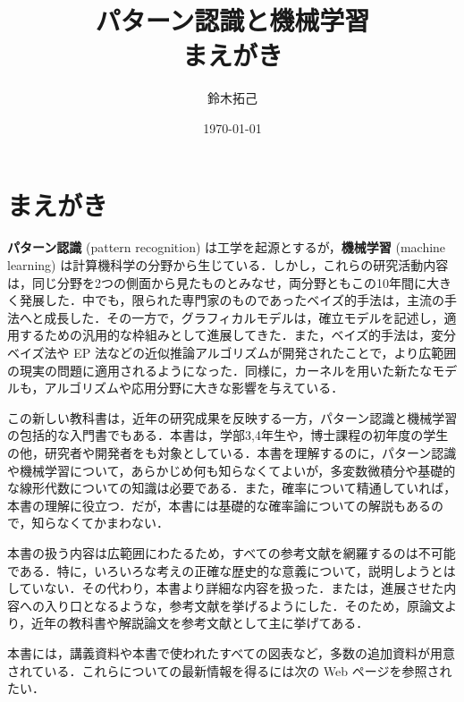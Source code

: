 \documentclass[uplatex,a4paper,oneside,openany,dvipdfmx]{jsarticle}
\title{パターン認識と機械学習\\まえがき}
\author{鈴木拓己}
\date{\today}
\numberwithin{equation}{section}
\theoremstyle{mystyle} %
\newcommand{\tb}[1]{\textbf{#1}}
\begin{document}
\maketitle
\setcounter{tocdepth}{3}


\renewcommand{\thesection}{\Alph{section}}
\renewcommand{\thesubsection}{\thesection-\arabic{subsection}}

\section*{まえがき}

\tb{パターン認識} (pattern recognition) は工学を起源とするが，\tb{機械学習} (machine learning) は計算機科学の分野から生じている．しかし，これらの研究活動内容は，同じ分野を2つの側面から見たものとみなせ，両分野ともこの10年間に大きく発展した．中でも，限られた専門家のものであったベイズ的手法は，主流の手法へと成長した．その一方で，グラフィカルモデルは，確立モデルを記述し，適用するための汎用的な枠組みとして進展してきた．また，ベイズ的手法は，変分ベイズ法や EP 法などの近似推論アルゴリズムが開発されたことで，より広範囲の現実の問題に適用されるようになった．同様に，カーネルを用いた新たなモデルも，アルゴリズムや応用分野に大きな影響を与えている．

この新しい教科書は，近年の研究成果を反映する一方，パターン認識と機械学習の包括的な入門書でもある．本書は，学部3,4年生や，博士課程の初年度の学生の他，研究者や開発者をも対象としている．本書を理解するのに，パターン認識や機械学習について，あらかじめ何も知らなくてよいが，多変数微積分や基礎的な線形代数についての知識は必要である．また，確率について精通していれば，本書の理解に役立つ．だが，本書には基礎的な確率論についての解説もあるので，知らなくてかまわない．

本書の扱う内容は広範囲にわたるため，すべての参考文献を網羅するのは不可能である．特に，いろいろな考えの正確な歴史的な意義について，説明しようとはしていない．その代わり，本書より詳細な内容を扱った．または，進展させた内容への入り口となるような，参考文献を挙げるようにした．そのため，原論文より，近年の教科書や解説論文を参考文献として主に挙げてある．

本書には，講義資料や本書で使われたすべての図表など，多数の追加資料が用意されている．これらについての最新情報を得るには次の Web ページを参照されたい．

\begin{center}
\end{center}
\end{document}

